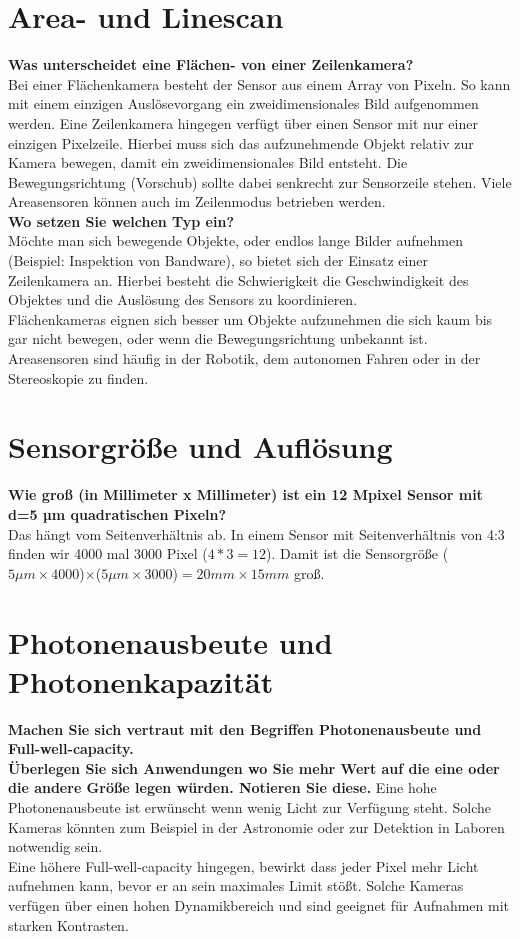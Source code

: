 \documentclass[a4paper]{article}
\begin{document}
	\section{Area- und Linescan}
	\textbf{Was unterscheidet eine Flächen- von einer Zeilenkamera?}\\
	Bei einer Flächenkamera besteht der Sensor aus einem Array von Pixeln. So kann mit einem einzigen Auslösevorgang ein zweidimensionales Bild aufgenommen werden. Eine Zeilenkamera hingegen verfügt über einen Sensor mit nur einer einzigen Pixelzeile. Hierbei muss sich das aufzunehmende Objekt relativ zur Kamera bewegen, damit ein zweidimensionales Bild entsteht. Die Bewegungsrichtung (Vorschub) sollte dabei senkrecht zur Sensorzeile stehen. Viele Areasensoren können auch im Zeilenmodus betrieben werden.\\
	\textbf{Wo setzen Sie welchen Typ ein?}\\
	Möchte man sich bewegende Objekte, oder endlos lange Bilder aufnehmen (Beispiel: Inspektion von Bandware), so bietet sich der Einsatz einer Zeilenkamera an. Hierbei besteht die Schwierigkeit die Geschwindigkeit des Objektes und die Auslösung des Sensors zu koordinieren.\\
	Flächenkameras eignen sich besser um Objekte aufzunehmen die sich kaum bis gar nicht bewegen, oder wenn die Bewegungsrichtung unbekannt ist. Areasensoren sind häufig in der Robotik, dem autonomen Fahren oder in der Stereoskopie zu finden.
	
	\section{Sensorgröße und Auflösung}
	\textbf{Wie groß (in Millimeter x Millimeter) ist ein 12 Mpixel Sensor mit d=5 µm quadratischen
	Pixeln?}\\
	Das hängt vom Seitenverhältnis ab. In einem Sensor mit Seitenverhältnis von 4:3 finden wir 4000 mal 3000 Pixel ($4*3=12$). Damit ist die Sensorgröße ($5\mu m\times 4000$)$\times$($5\mu m\times 3000$)$=20mm \times 15mm$ groß.
	
	\section{Photonenausbeute und Photonenkapazität}
	\textbf{Machen Sie sich vertraut mit den Begriffen Photonenausbeute und Full-well-capacity.}\\
	\textbf{Überlegen Sie sich Anwendungen wo Sie mehr Wert auf die eine oder die andere Größe
	legen würden. Notieren Sie diese.}
	Eine hohe Photonenausbeute ist erwünscht wenn wenig Licht zur Verfügung steht. Solche Kameras könnten zum Beispiel in der Astronomie oder zur Detektion in Laboren notwendig sein.\\
	Eine höhere Full-well-capacity hingegen, bewirkt dass jeder Pixel mehr Licht aufnehmen kann, bevor er an sein maximales Limit stößt. Solche Kameras verfügen über einen hohen Dynamikbereich und sind geeignet für Aufnahmen mit starken Kontrasten.
	
\end{document}
